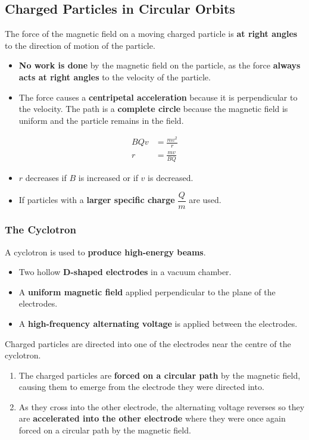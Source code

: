 \subsection{Charged Particles in Circular Orbits}

The force of the magnetic field on a moving charged particle is \textbf{at right angles} to the direction of motion of the particle.
\begin{itemize}
    \item \textbf{No work is done} by the magnetic field on the particle, as the force \textbf{always acts at right angles} to the velocity of the particle.
    \item The force causes a \textbf{centripetal acceleration} because it is perpendicular to the velocity. The path is a \textbf{complete circle} because the magnetic field is uniform and the particle remains in the field.
\end{itemize}

\begin{align*}
    BQv&=\frac{mv^2}{r}\\
    r&=\frac{mv}{BQ}
\end{align*}

\begin{itemize}
    \item $r$ decreases if $B$ is increased or if $v$ is decreased.
    \item If particles with a \textbf{larger specific charge} $\dfrac{Q}{m}$ are used.
\end{itemize}

\subsubsection*{The Cyclotron}

A cyclotron is used to \textbf{produce high-energy beams}.

\begin{itemize}
    \item Two hollow \textbf{D-shaped electrodes} in a vacuum chamber.
    \item A \textbf{uniform magnetic field} applied perpendicular to the plane of the electrodes.
    \item A \textbf{high-frequency alternating voltage} is applied between the electrodes.
\end{itemize}

Charged particles are directed into one of the electrodes near the centre of the cyclotron.
\begin{enumerate}
    \item The charged particles are \textbf{forced on a circular path} by the magnetic field, causing them to emerge from the electrode they were directed into.
    \item As they cross into the other electrode, the alternating voltage reverses so they are \textbf{accelerated into the other electrode} where they were once again forced on a circular path by the magnetic field.
\end{enumerate}

